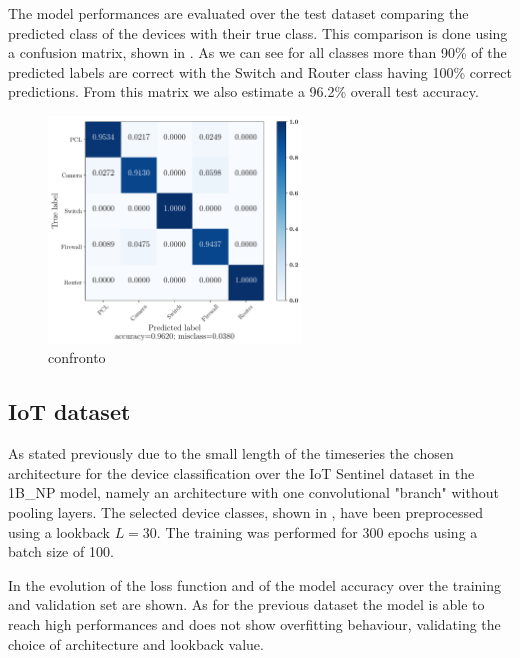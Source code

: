 The model performances are evaluated over the test dataset comparing the predicted class of the devices with their true class. This comparison is done using a confusion matrix, shown in . As we can see for all classes more than 90\% of the predicted labels are correct with the Switch and Router class having 100\% correct predictions. From this matrix we also estimate a 96.2\% overall test accuracy.

\begin{figure}[h]
    \centering
        \includegraphics[width=0.6\textwidth]{images/results/4SICS_clasf_20210613-174409__type_1branch__st_scale_sub__lb_100__act_elu__nf_16__ks_10__nn_50__l2_1e-05__bs_200__ep_300___cm.pdf}
    \caption{confronto}
    \label{fig:4sics_results_cm}
\end{figure}

\subsection{IoT dataset}

As stated previously due to the small length of the timeseries the chosen architecture for the device classification over the IoT Sentinel dataset in the 1B\_NP model, namely an architecture with one convolutional "branch" without pooling layers. The selected device classes, shown in , have been preprocessed using a lookback $L=30$. The training was performed for 300 epochs using a batch size of 100. 

In  the evolution of the loss function and of the model accuracy over the training and validation set are shown. As for the previous dataset the model is able to reach high performances and does not show overfitting behaviour, validating the choice of architecture and lookback value. 


